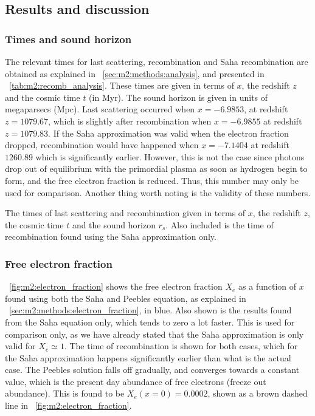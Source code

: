 \subsection{Results and discussion}\label{sec:m2:results} 

    \subsubsection{Times and sound horizon}
    The relevant times for last scattering, recombination and Saha recombination are obtained as explained in ~\cref{sec:m2:methods:analysis}, and presented in ~\cref{tab:m2:recomb_analysis}. These times are given in terms of $x$, the redshift $z$ and the cosmic time $t$ (in Myr). The sound horizon is given in units of megaparsecs (Mpc). Last scattering occurred when $x=-6.9853$, at redshift $z=1079.67$, which is slightly after recombination when $x=-6.9855$ at redshift $z=1079.83$. If the Saha approximation was valid when the electron fraction dropped, recombination would have happened when $x=-7.1404$ at redshift $1260.89$ which is significantly earlier. However, this is not the case since photons drop out of equilibrium with the primordial plasma as soon as hydrogen begin to form, and the free electron fraction is reduced. Thus, this number may only be used for comparison. Another thing worth noting is the validity of these numbers.
    \begin{table}
        
        \caption{The times of last scattering and recombination given in terms of $x$, the redshift $z$, the cosmic time $t$ and the sound horizon $r_s$. Also included is the time of recombination found using the Saha approximation only.}
        \label{tab:m2:recomb_analysis}
    \end{table}

    \subsubsection{Free electron fraction}
    ~\cref{fig:m2:electron_fraction} shows the free electron fraction $X_e$ as a function of $x$ found using both the Saha and Peebles equation, as explained in ~\cref{sec:m2:methods:electron_fraction}, in blue. Also shown is the results found from the Saha equation only, which tends to zero a lot faster. This is used for comparison only, as we have already stated that the Saha approximation is only valid for $X_e\simeq 1$. The time of recombination is shown for both cases, which for the Saha approximation happens significantly earlier than what is the actual case. The Peebles solution falls off gradually, and converges towards a constant value, which is the present day abundance of free electrons (freeze out abundance). This is found to be $X_e(x=0) = 0.0002$, shown as a brown dashed line in ~\cref{fig:m2:electron_fraction}.

